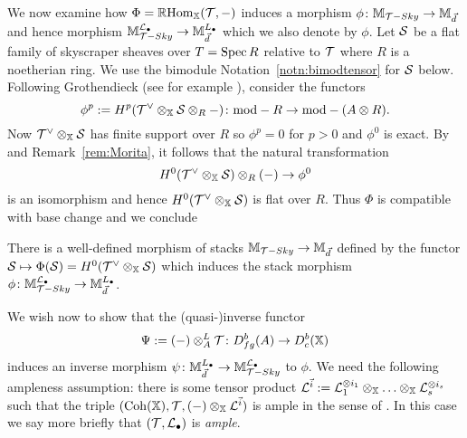 \documentclass[12pt]{amsart}
\begin{document}
We now examine how $\Phi = \mathop{\mathbb{R}\mathrm{Hom}}\nolimits_{\mathbb{X}}(\mathcal{T}, -)$ induces a morphism $\phi \colon \mathbb{M}_{\mathcal{T}-Sky} \to \mathbb{M}_{\vec{d}}$ and hence morphism $\mathbb{M}_{\mathcal{T}-Sky}^{\mathcal{L}_{\bullet}} \to \mathbb{M}_{\vec{d}}^{L_{\bullet}}$ which we also denote by $\phi$. Let $\mathcal{S}$ be a flat family of skyscraper sheaves over $T = \operatorname{Spec} R$ relative to $\mathcal{T}$ where $R$ is a noetherian ring. We use the bimodule Notation~\ref{notn:bimodtensor} for $\mathcal{S}$ below. Following Grothendieck (see for example \cite[Chapter~III, Section~12]{Hart}), consider the functors 
$$ \phi^p := H^p(\mathcal{T}^{\vee} \otimes_{\mathbb{X}} \mathcal{S} \otimes_R - ) \colon 
\textup{mod}-R \to \textup{mod}-(A \otimes R).$$
Now $\mathcal{T}^{\vee}\otimes_{\mathbb{X}} \mathcal{S}$ has finite support over $R$ so $\phi^p = 0$ for $p >0$ and $\phi^0$ is exact. By \cite[Proposition~12.5]{Hart} and Remark~\ref{rem:Morita}, it follows that the natural transformation
$$ H^0(\mathcal{T}^{\vee} \otimes_{\mathbb{X}} \mathcal{S}) \otimes_R (-) \to  \phi^0$$
is an isomorphism and hence $H^0(\mathcal{T}^{\vee} \otimes_{\mathbb{X}} \mathcal{S})$ is flat over $R$. Thus $\Phi$ is compatible with base change and we conclude 
\begin{proposition}  \label{prop:transfermap}
There is a well-defined morphism of stacks $\mathbb{M}_{\mathcal{T}-Sky} \to \mathbb{M}_{\vec{d}}$ defined by the functor $\mathcal{S} \mapsto \Phi(\mathcal{S}) = H^0(\mathcal{T}^{\vee} \otimes_{\mathbb{X}} \mathcal{S})$ which induces the stack morphism $\phi \colon \mathbb{M}_{\mathcal{T}-Sky}^{\mathcal{L}_{\bullet}} \to \mathbb{M}_{\vec{d}}^{L_{\bullet}}$.
\end{proposition}

We wish now to show that the (quasi-)inverse functor 
$$\Psi:=(-) \otimes^L_{A} \mathcal{T} \colon D^b_{fg}(A) \to D^b_{c}(\mathbb{X})$$
induces an inverse morphism $\psi \colon \mathbb{M}_{\vec{d}}^{L_{\bullet}} \to \mathbb{M}_{\mathcal{T}-Sky}^{\mathcal{L}_{\bullet}}$ to $\phi$. We need the following ampleness assumption: there is some tensor product $\mathcal{L}^{\vec{i}} := \mathcal{L}_1^{\otimes i_1} \otimes_{\mathbb{X}} \ldots \otimes_{\mathbb{X}} \mathcal{L}_s^{\otimes i_s}$ such that the triple $(\operatorname{Coh}(\mathbb{X}), \mathcal{T}, (-)\otimes_{\mathbb{X}} \mathcal{L}^{\vec{i}})$ is ample in the sense of \cite{AZ94}. In this case we say more briefly that $(\mathcal{T}, \mathcal{L}_{\bullet})$ is {\em ample}.
\end{document}
